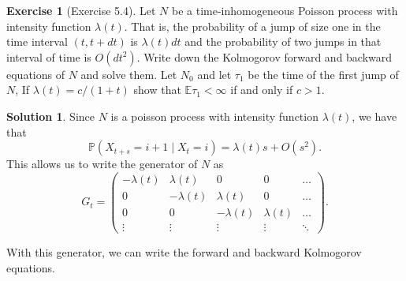 \documentclass[12pt]{article}
\newcommand{\Prob}{\mathbb{P}}
\newcommand{\Expect}{\mathbb{E}}
\theoremstyle{definition}
\newtheorem{exer}{Exercise}
\newtheorem{sol}{Solution}
\theoremstyle{remark}
\begin{document}
\newpage 

\begin{exer}[Exercise 5.4]
    Let $N$ be a time-inhomogeneous Poisson process with intensity function $\lambda(t)$. That is, the probability of a jump of size one in the time interval $(t,t+dt)$ is $\lambda(t)dt$ and the probability of two jumps in that interval of time is $O(dt^{2})$. Write down the Kolmogorov forward and backward equations of $N$ and solve them. Let $N_{0}$ and let $\tau_{1}$ be the time of the first jump of $N$, If  $\lambda(t) = c / (1 + t)$ show that  $\Expect \tau_{1} < \infty$ if and only if $c>1$.
\end{exer}

\begin{sol}
    Since $N$ is a poisson process with intensity function $\lambda(t)$, we have that
\begin{equation*}
    \Prob(X_{t+s} = i + 1 \mid X_{t} = i) = \lambda(t)s + O(s^{2}).
\end{equation*}
This allows us to write the generator of $N$ as 
\begin{equation*}
G_{t} 
=
\begin{pmatrix}
    - \lambda(t) & \lambda(t) & 0 & 0 & \ldots\\
    0            & -\lambda(t)& \lambda(t) & 0 &  \ldots\\
    0            & 0          & -\lambda(t) & \lambda(t) & \ldots\\
    \vdots       & \vdots     & \vdots      & \vdots & \ddots
\end{pmatrix}.
\end{equation*}
\end{sol}

With this generator, we can write the forward and backward Kolmogorov equations. 
\end{document}
